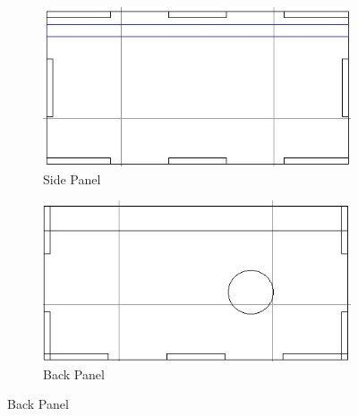 \documentclass[12pt,a4paper]{article}
\begin{document}
\begin{figure}[H]
    \vspace{0.5cm} %
    
    \begin{subfigure}{0.48\textwidth} %
        \centering
        \includegraphics[width=\textwidth]{Design_Cycle_2.3.jpeg} %
        \caption{Side Panel}
        \label{fig:Side Panel}
    \end{subfigure}
    \hfill
    \begin{subfigure}{0.48\textwidth} %
        \centering
        \includegraphics[width=\textwidth]{Design_Cycle_2.4.jpeg} %
        \caption{Back Panel}
        \label{fig:Back Panel}
    \end{subfigure}
    
    \vspace{0.5cm} %
    

\end{figure}
\end{document}
